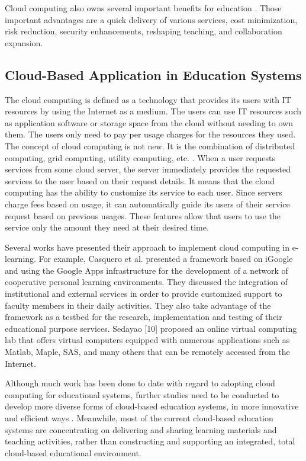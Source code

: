 \documentclass[journal]{vgtc}                %
\begin{document}
  Cloud computing also owns several important benefits for education \cite{Bouyer2014}. Those important advantages are a quick delivery of various services, cost minimization, risk reduction, security enhancements, reshaping teaching, and collaboration expansion.

  \subsection{Cloud-Based Application in Education Systems}
  The cloud computing is defined as a technology that provides its users with IT resources by using the Internet as a medium. The users can use IT resources such as application software or storage space from the cloud without needing to own them. The users only need to pay per usage charges for the resources they used. The concept of cloud computing is not new. It is the combination of distributed computing, grid computing, utility computing, etc. \cite{s110807835}. When a user requests services from some cloud server, the server immediately provides the requested services to the user based on their request details. It means that the cloud computing has the ability to customize its service to each user. Since servers charge fees based on usage, it can automatically guide its users of their service request based on previous usages. These features allow that users to use the service only the amount they need at their desired time.
  
  Several works have presented their approach to implement cloud computing in e-learning. For example, Casquero et al. \cite{casquero2008igoogle} presented a framework based on iGoogle and using the Google Apps infrastructure for the development of a network of cooperative personal learning environments. They discussed the integration of institutional and external services in order to provide customized support to faculty members in their daily activities. They also take advantage of the framework as a testbed for the research, implementation and testing of their educational purpose services. Sedayao [10] proposed an online virtual computing lab that offers virtual computers equipped with numerous applications such as Matlab, Maple, SAS, and many others that can be remotely accessed from the Internet.

  Although much work has been done to date with regard to adopting cloud computing for educational systems, further studies need to be conducted to develop more diverse forms of cloud-based education systems, in more innovative and efficient ways \cite{jeong2013content}. Meanwhile, most of the current cloud-based education systems are concentrating on delivering and sharing learning materials and teaching activities, rather than constructing and supporting an integrated, total cloud-based educational environment.
\end{document}
